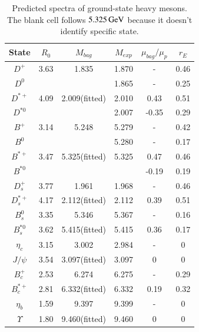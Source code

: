 \documentclass[prd,twocolumn,floatfix,nofootinbib]{revtex4}
\begin{document}
\renewcommand{\tabcolsep}{0.3cm}
\renewcommand{\arraystretch}{1.3}
\begin{table}[!htbp]
    \caption{Predicted spectra of ground-state heavy mesons. The blank cell follows $5.325\,{\rm GeV}$ because it doesn’t identify specific state.}
    \label{tab:heavymeson}
    \begin{tabular}{cccccc}
        \hline\hline
        {\rm State}             &$R_{0}$    &$M_{bag}$      &$M_{exp}$  &$\mu_{bag}/\mu_{p}$    &$r_{E}$ \\ \hline
        $D^{+}$ 	            &3.63	    &1.835	        &1.870	    &-                      &0.46 \\
        $D^{0}$ 			    &           &               &1.865	    &-                      &0.25 \\
        $D^{\ast +}$ 	        &4.09	    &2.009(fitted)  &2.010	    &0.43                   &0.51 \\
        $D^{\ast 0}$ 		    &           &               &2.007	    &-0.35                  &0.29 \\
        $B^{+}$ 	            &3.14	    &5.248	        &5.279	    &-                      &0.42 \\
        $B^{0}$ 			    &           &               &5.280	    &-                      &0.17 \\
        $B^{\ast +}$ 	        &3.47	    &5.325(fitted)  &5.325      &0.47                   &0.46 \\
        $B^{\ast 0}$ 		    &           &               &           &-0.19                  &0.19 \\
        $D_{s}^{+}$ 	        &3.77	    &1.961	        &1.968	    &-                      &0.46 \\
        $D_{s}^{\ast +}$ 	    &4.17	    &2.112(fitted)  &2.112	    &0.39                   &0.51 \\
        $B_{s}^{0}$ 	        &3.35	    &5.346	        &5.367	    &-                      &0.16 \\
        $B_{s}^{\ast 0}$ 	    &3.62	    &5.415(fitted)  &5.415	    &0.36                   &0.17 \\
        $\eta_{c}$ 	            &3.15	    &3.002	        &2.984	    &-                      &0 \\
        $J/\psi$ 	            &3.54	    &3.097(fitted)  &3.097	    &0                      &0 \\
        $B_{c}^{+}$ 	        &2.53	    &6.274	        &6.275	    &-                      &0.29 \\
        $B_{c}^{\ast +}$ 	    &2.81	    &6.332(fitted)  &6.332	    &0.19                   &0.32 \\
        $\eta_{b}$ 	            &1.59	    &9.397	        &9.399	    &-                      &0 \\
        $\Upsilon$ 	            &1.80	    &9.460(fitted)  &9.460	    &0                      &0 \\
        \hline\hline
    \end{tabular}
\end{table}
\end{document}

